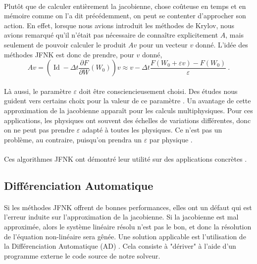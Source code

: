       \paragraph{}
      Plutôt que de calculer entièrement la jacobienne, chose coûteuse en temps et en mémoire comme on l'a dit précédemment, on peut se contenter d'approcher son action.
      En effet, lorsque nous avions introduit les méthodes de Krylov, nous avions remarqué qu'il n'était pas nécessaire de connaître explicitement $A$, mais seulement de pouvoir calculer le produit $Av$ pour un vecteur $v$ donné.
      L'idée des méthodes JFNK est donc de prendre, pour $v$ donné,
      \[Av = \left(\operatorname{Id} - \Delta t\frac{\partial F}{\partial W}\left(W_0\right)\right)v \approx v - \Delta t\frac{F\left(W_0 + \varepsilon v\right) - F\left(W_0\right)}{\varepsilon}\ .\]

      \paragraph{}
      Là aussi, le paramètre $\varepsilon$ doit être consciencieusement choisi.
      Des études nous guident vers certains choix pour la valeur de ce paramètre \cite{KnollKeyes2004}.
      Un avantage de cette approximation de la jacobienne apparaît pour les calculs multiphysiques.
      Pour ces applications, les physiques ont souvent des échelles de variations différentes, donc on ne peut pas prendre $\varepsilon$ adapté à toutes les physiques.
      Ce n'est pas un problème, au contraire, puisqu'on prendra un $\varepsilon$ par physique \cite{Turpault2003}.

      \paragraph{}
      Ces algorithmes JFNK ont démontré leur utilité sur des applications concrètes \cite{LiuZhangZhongEtAl2015, FrancoCamierAndrejEtAl2020}.


  \subsection{Différenciation Automatique}

    \paragraph{}
    Si les méthodes JFNK offrent de bonnes performances, elles ont un défaut qui est l'erreur induite sur l'approximation de la jacobienne.
    Si la jacobienne est mal approximée, alors le système linéaire résolu n'est pas le bon, et donc la résolution de l'équation non-linéaire sera gênée.
    Une solution applicable est l'utilisation de la Différenciation Automatique (AD) \cite{Griewank2000}.
    Cela consiste à "dériver" à l'aide d'un programme externe \cite{HascoeetPascual2012} le code source de notre solveur.

